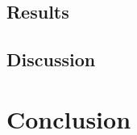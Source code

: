 \documentclass[a4paper, 11pt, oneside]{Thesis}  %
\begin{document}
\section{Results}

\section{Discussion}

\chapter{Conclusion}









\backmatter

\label{Bibliography}
\end{document}
